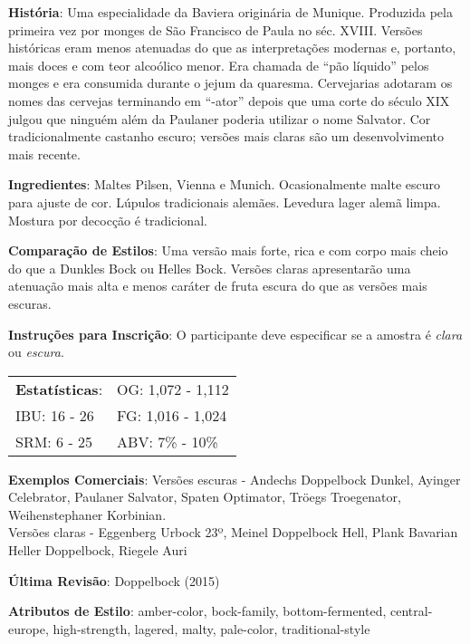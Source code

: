 \textbf{História}: Uma especialidade da Baviera originária de Munique. Produzida pela primeira vez por monges de São Francisco de Paula no séc. XVIII. Versões históricas eram menos atenuadas do que as interpretações modernas e, portanto, mais doces e com teor alcoólico menor. Era chamada de “pão líquido” pelos monges e era consumida durante o jejum da quaresma. Cervejarias adotaram os nomes das cervejas terminando em “-ator” depois que uma corte do século XIX julgou que ninguém além da Paulaner poderia utilizar o nome Salvator. Cor tradicionalmente castanho escuro; versões mais claras são um desenvolvimento mais recente.

\textbf{Ingredientes}: Maltes Pilsen, Vienna e Munich. Ocasionalmente malte escuro para ajuste de cor. Lúpulos tradicionais alemães. Levedura lager alemã limpa. Mostura por decocção é tradicional.

\textbf{Comparação de Estilos}: Uma versão mais forte, rica e com corpo mais cheio do que a Dunkles Bock ou Helles Bock. Versões claras apresentarão uma atenuação mais alta e menos caráter de fruta escura do que as versões mais escuras.

\textbf{Instruções para Inscrição}: O participante deve especificar se a amostra é \textit{clara} ou \textit{escura}.

\begin{tabular}{@{}p{35mm}p{35mm}@{}}
  \textbf{Estatísticas}: & OG: 1,072 - 1,112 \\
  IBU: 16 - 26 & FG: 1,016 - 1,024 \\
  SRM: 6 - 25 & ABV: 7\% - 10\%
\end{tabular}

\textbf{Exemplos Comerciais}: Versões escuras - Andechs Doppelbock Dunkel, Ayinger Celebrator, Paulaner Salvator, Spaten Optimator, Tröegs Troegenator, Weihenstephaner Korbinian.\\
Versões claras - Eggenberg Urbock 23º, Meinel Doppelbock Hell, Plank Bavarian Heller Doppelbock, Riegele Auri

\textbf{Última Revisão}: Doppelbock (2015)

\textbf{Atributos de Estilo}: amber-color, bock-family, bottom-fermented, central-europe, high-strength, lagered, malty, pale-color, traditional-style
